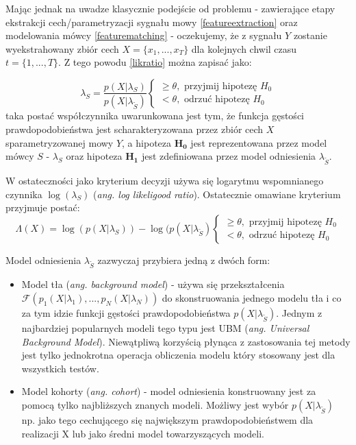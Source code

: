 Mając jednak na uwadze klasycznie podejście od problemu - zawierające etapy ekstrakcji cech/parametryzacji sygnału mowy \ref{featureextraction} oraz modelowania mówcy \ref{featurematching} - oczekujemy, że z sygnału $Y$ zostanie wyekstrahowany zbiór cech $X = \{x_1,...,x_T\}$ dla kolejnych chwil czasu $t = \{1,...,T\}$. Z tego powodu \ref{likratio} można zapisać jako:

\begin{equation}
  \lambda_S = \frac{p(X|\lambda_S)}{p(X|\lambda_{\tilde{S}})}
  \begin{cases}
    \ge \theta, \textrm{ przyjmij hipotezę } H_0 \\
    < \theta, \textrm{ odrzuć hipotezę } H_0
  \end{cases}
\end{equation}
taka postać współczynnika uwarunkowana jest tym, że funkcja gęstości prawdopodobieństwa jest scharakteryzowana przez zbiór cech $X$ sparametryzowanej mowy $Y$, a hipoteza $\bm{H_0}$ jest reprezentowana przez model mówcy $S$ - $\lambda_{S}$  oraz hipoteza $\bm{H_1}$ jest zdefiniowana przez model odniesienia $\lambda_{\tilde{S}}$.

W ostateczności jako kryterium decyzji używa się logarytmu wspomnianego czynnika $\log \left( \lambda_S \right)$ (\textit{ang. log likeligood ratio}). Ostatecznie omawiane kryterium przyjmuje postać:
\begin{equation}
  \label{loglike}
  \Lambda(X)= \log({p(X|\lambda_S)}) - \log({p(X|\lambda_{\tilde{S}})}
  \begin{cases}
    \ge \theta, \textrm{ przyjmij hipotezę } H_0 \\
    < \theta, \textrm{ odrzuć hipotezę } H_0
  \end{cases}
\end{equation}

Model odniesienia $\lambda_{\tilde{S}}$ zazwyczaj przybiera jedną z dwóch form:
\begin{itemize}
  \item{Model tła (\textit{ang. background model})} - używa się przekształcenia $\mathcal{F}(p_1(X|\lambda_1),...,p_N(X|\lambda_N))$ do skonstruowania jednego modelu tła i co za tym idzie funkcji gęstości prawdopodobieństwa $p(X|\lambda_{\tilde{S}})$. Jednym z najbardziej popularnych modeli tego typu jest UBM (\textit{ang. Universal Background Model}). Niewątpliwą korzyścią płynąca z zastosowania tej metody jest tylko jednokrotna operacja obliczenia modelu który stosowany jest dla wszystkich testów.
  \item{Model kohorty (\textit{ang. cohort})} - model odniesienia konstruowany jest za pomocą tylko najbliższych znanych modeli. Możliwy jest wybór $p(X|\lambda_{\tilde{S}})$ np. jako tego cechującego się największym prawdopodobieństwem dla realizacji X lub jako średni model towarzyszących modeli.
\end{itemize}

